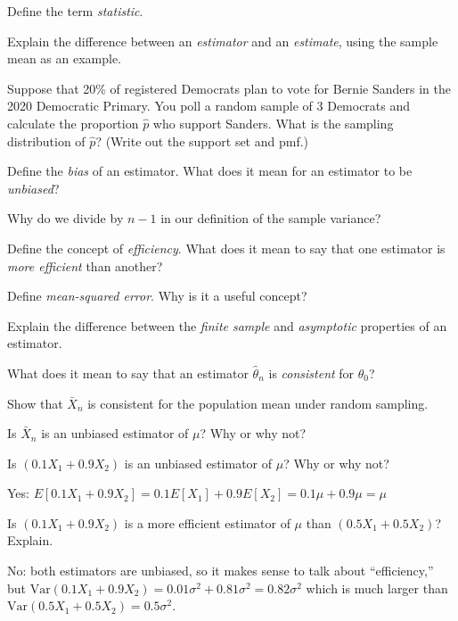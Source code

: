 \documentclass[addpoints,12pt]{exam}
\begin{document}
\begin{questions}
\question Define the term \emph{statistic}. 

\question Explain the difference between an \emph{estimator} and an \emph{estimate}, using the sample mean as an example.

\question Suppose that 20\% of registered Democrats plan to vote for Bernie Sanders in the 2020 Democratic Primary. 
You poll a random sample of 3 Democrats and calculate the proportion $\widehat{p}$ who support Sanders. 
What is the sampling distribution of $\widehat{p}$? 
(Write out the support set and pmf.)



\question Define the \emph{bias} of an estimator. What does it mean for an estimator to be \emph{unbiased}?

\question Why do we divide by $n-1$ in our definition of the sample variance?

\question Define the concept of \emph{efficiency}. What does it mean to say that one estimator is \emph{more efficient} than another?

\question Define \emph{mean-squared error}. Why is it a useful concept?

\question Explain the difference between the \emph{finite sample} and \emph{asymptotic} properties of an estimator.

\question What does it mean to say that an estimator $\widehat{\theta}_n$ is \emph{consistent} for $\theta_0$?

\question Show that $\bar{X}_n$ is consistent for the population mean under random sampling.


  \question Is $\bar{X}_n$ is an unbiased estimator of $\mu$? Why or why not?

  \question Is $(0.1 X_1 + 0.9 X_2)$ is an unbiased estimator of $\mu$? Why or why not?
  \begin{solution}
    Yes: $E[0.1 X_1 + 0.9 X_2] = 0.1 E[X_1] + 0.9 E[X_2] = 0.1 \mu + 0.9\mu = \mu$
  \end{solution}

\question Is $(0.1X_1 + 0.9X_2)$ is a more efficient estimator of $\mu$ than $(0.5X_1 + 0.5X_2)$? Explain.
\begin{solution}
  No: both estimators are unbiased, so it makes sense to talk about ``efficiency,'' but $\mbox{Var}(0.1 X_1 + 0.9 X_2) = 0.01 \sigma^2 + 0.81 \sigma^2 = 0.82 \sigma^2$ which is much larger than $\mbox{Var}(0.5 X_1 + 0.5 X_2) = 0.5 \sigma^2$.
\end{solution}


\end{questions}
\end{document}
